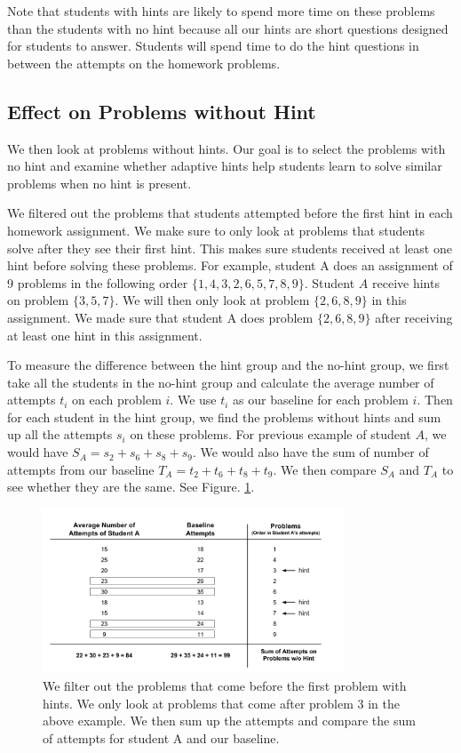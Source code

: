 \documentclass{llncs}
\begin{document}
Note that students with hints are likely to spend more time on these problems than the students with no hint because all our hints are short questions designed for students to answer. Students will spend time to do the hint questions in between the attempts on the homework problems.

\subsection{Effect on Problems without Hint}
We then look at problems without hints. Our goal is to select the problems with no hint and examine whether adaptive hints help students learn to solve similar problems when no hint is present.

We filtered out the problems that students attempted before the first hint in each homework assignment. We make sure to only look at problems that students solve after they see their first hint. This makes sure students received at least one hint before solving these problems. For example, student A does an assignment of 9 problems in the following order $\{ 1, 4, 3, 2, 6, 5, 7, 8, 9\}$. Student $A$ receive hints on problem $\{3, 5, 7\}$. We will then only look at problem $\{2, 6, 8, 9\}$ in this assignment. We made sure that student A does problem $\{2, 6, 8, 9\}$ after receiving at least one hint in this assignment.

To measure the difference between the hint group and the no-hint group, we first take all the students in the no-hint group and calculate the average number of attempts $t_i$ on each problem $i$. We use $t_i$ as our baseline for each problem $i$. Then for each student in the hint group, we find the problems without hints and sum up all the attempts $s_i$ on these problems. For previous example of student $A$, we would have $S_A = s_2 + s_6 + s_8 + s_9$. We would also have the sum of number of attempts from our baseline $T_A = t_2 + t_6 + t_8 + t_9$. We then compare $S_A$ and $T_A$ to see whether they are the same. See Figure. \ref{fig:pro_no_hint}.

\begin{figure}[ht]
   \centering
   \includegraphics[width=0.8\textwidth]{image/Filter_problems.png}
   \caption{We filter out the problems that come before the first problem with hints. We only look at problems that come after problem 3 in the above example. We then sum up the attempts and compare the sum of attempts for student A and our baseline.}
   \label{fig:pro_no_hint}
\end{figure}
\end{document}
